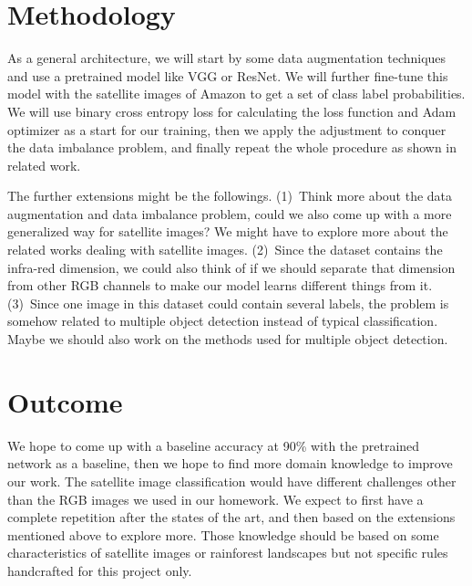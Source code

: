 \documentclass[10pt,twocolumn,letterpaper]{article}
\begin{document}
\section{Methodology}
    As a general architecture,
    we will start by some data augmentation techniques and
    use a pretrained model like VGG or ResNet. 
    We will further fine-tune this model with the satellite images of Amazon
    to get a set of class label probabilities. 
    We will use binary cross entropy loss for calculating the loss function and
    Adam optimizer as a start for our training,
    then we apply the adjustment to conquer the data imbalance problem,
    and finally repeat the whole procedure as shown in related work.

    The further extensions might be the followings.
    (1)~Think more about the data augmentation and data imbalance problem,
    could we also come up with a more generalized way for satellite images?
    We might have to explore more about the related works dealing with 
    satellite images.
    (2)~Since the dataset contains the infra-red dimension,
    we could also think of if we should separate that dimension
    from other RGB channels to make our model learns different things from it.
    (3)~Since one image in this dataset could contain several labels,
    the problem is somehow related to multiple object detection 
    instead of typical classification.
    Maybe we should also work on the methods used for multiple object detection.


\section{Outcome}
    We hope to come up with a baseline accuracy at 90\%
    with the pretrained network as a baseline,
    then we hope to find more domain knowledge to improve our work.
    The satellite image classification would have
    different challenges other than the RGB images we used in our homework.
    We expect to first have a complete repetition after the states of the art,
    and then based on the extensions mentioned above to explore more.
    Those knowledge should be based on some characteristics
    of satellite images or rainforest landscapes
    but not specific rules handcrafted for this project only.

{\small


}
\end{document}
